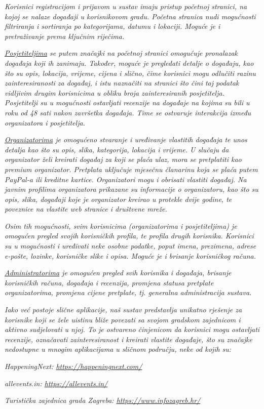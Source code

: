 		\textit{Korisnici registracijom i prijavom u sustav imaju pristup početnoj stranici, na kojoj se nalaze događaji u korisnikovom gradu. Početna stranica nudi mogućnosti filtriranja i sortiranja po kategorijama, datumu i lokaciji. Moguće je i pretraživanje prema ključnim riječima.}

		\textit{}
		
		\textit{\underline{Posjetiteljima} se putem značajki na početnoj stranici omogućuje pronalazak događaja koji ih zanimaju. Također, moguće je pregledati detalje o događaju, kao što su opis, lokacija, vrijeme, cijena i slično, čime korisnici mogu odlučiti razinu zainteresiranosti za događaj, i istu naznačiti na stranici što čini taj podatak vidljivim drugim korisnicima u obliku broja zainteresiranih posjetitelja. Posjetitelji su u mogućnosti ostavljati recenzije na događaje na kojima su bili u roku od 48 sati nakon završetka događaja. Time se ostvaruje interakcija između organizatora i posjetitelja. }
		
		\textit{\underline{Organizatorima} je omogućeno stvaranje i uređivanje vlastitih događaja te unos detalja kao što su opis, slika, kategorija, lokacija i vrijeme. U slučaju da organizator želi kreirati događaj za koji se plaća ulaz, mora se pretplatiti kao premium organizator. Pretplata uključuje mjesečnu članarinu koja se plaća putem PayPal-a ili kreditne kartice. Organizatori mogu i obrisati vlastiti događaj. Na javnim profilima organizatora prikazane su informacije o organizatoru, kao što su opis, slika, događaji koje je organizator kreirao u protekle dvije godine, te poveznice na vlastite web stranice i društvene mreže.}

		\textit{Osim tih mogućnosti, svim korisnicima (organizatorima i posjetiteljima) je omogućen pregled svojih korisničkih profila, te profila drugih korisnika. Korisnici su u mogućnosti i uređivati neke osobne podatke, poput imena, prezimena, adrese e-pošte, lozinke, korisničke slike i opisa. Moguće je i brisanje korisničkog računa.}

		\textit{\underline{Administratorima} je omogućen pregled svih korisnika i događaja, brisanje korisničkih računa, događaja i recenzija, promjena statusa pretplate organizatorima, promjena cijene pretplate, tj. generalna administracija sustava.}

		\textit{}
		
		\textit{Iako već postoje slične aplikacije, naš sustav predstavlja unikatno rješenje za korisnike koji se žele uistinu bliže povezati sa svojom gradskom zajednicom i aktivno sudjelovati u njoj. To je ostvareno činjenicom da korisnici mogu ostavljati recenzije, označavati zainteresiranost i kreirati vlastite događaje, što su značajke nedostupne u mnogim aplikacijama u sličnom području, neke od kojih su:}
		 \begin{packed_item}
			\item \textit{HappeningNext: \url{https://happeningnext.com/}}
			\item \textit{allevents.in: \url{https://allevents.in/}}
			\item \textit{Turistička zajednica grada Zagreba: \url{https://www.infozagreb.hr/}}
		 \end{packed_item}	

